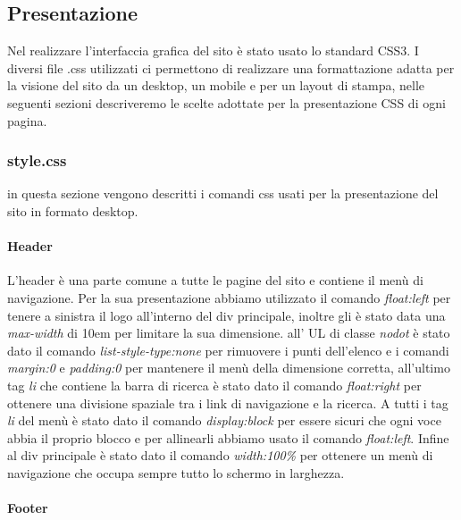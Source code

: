\subsection{Presentazione}
Nel realizzare l'interfaccia grafica del sito è stato usato lo standard CSS3.\newline
I diversi file .css utilizzati ci permettono di realizzare una formattazione adatta per la visione del sito da un desktop, un mobile e per un layout di stampa, nelle seguenti sezioni descriveremo le scelte adottate per la presentazione CSS di ogni pagina.

\subsubsection{style.css}
in questa sezione vengono descritti i comandi css usati per la presentazione del sito in formato desktop.

\paragraph{Header} \Spazio
L'header è una parte comune a tutte le pagine del sito e contiene il menù di navigazione. \newline Per la sua presentazione abbiamo utilizzato il comando \emph{float:left} per tenere a sinistra il logo all'interno del div principale, inoltre gli è stato data una \emph{max-width} di 10em per limitare la sua dimensione. all' UL di classe \emph{nodot} è stato dato il comando \emph{list-style-type:none} per rimuovere i punti dell'elenco e i comandi \emph{margin:0} e \emph{padding:0} per mantenere il menù della dimensione corretta, all'ultimo tag \emph{li} che contiene la barra di ricerca è stato dato il comando \emph{float:right} per ottenere una divisione spaziale tra i link di navigazione e la ricerca.
A tutti i tag \emph{li} del menù è stato dato il comando \emph{display:block} per essere sicuri che ogni voce abbia il proprio blocco e per allinearli abbiamo usato il comando \emph{float:left}.
Infine al div principale è stato dato il comando \emph{width:100\%} per ottenere un menù di navigazione che occupa sempre tutto lo schermo in larghezza.

\paragraph{Footer} \Spazio



